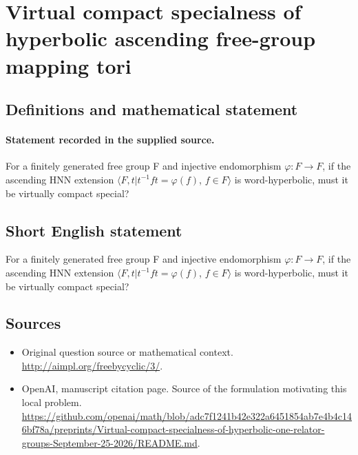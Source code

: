 \documentclass[11pt]{article}
\begin{document}
\section*{Virtual compact specialness of hyperbolic ascending free-group mapping tori}\label{statement}
\subsection{Definitions and mathematical statement}
\paragraph{Statement recorded in the supplied source.}
For a finitely generated free group F and injective endomorphism $\varphi :F\to F$, if the ascending HNN extension $\langle F,t|t^{-1}ft=\varphi (f)$, $f\in F\rangle $ is word-hyperbolic, must it be virtually compact special?
\subsection{Short English statement}
For a finitely generated free group F and injective endomorphism $\varphi :F\to F$, if the ascending HNN extension $\langle F,t|t^{-1}ft=\varphi (f)$, $f\in F\rangle $ is word-hyperbolic, must it be virtually compact special?
\subsection{Sources}
\begin{itemize}
\item[S1] Original question source or mathematical context.
\url{http://aimpl.org/freebycyclic/3/}.
\item[S2] OpenAI, manuscript citation page. Source of the formulation motivating this local problem.
\url{https://github.com/openai/math/blob/adc7f1241b42e322a6451854ab7e4b4c146bf78a/preprints/Virtual-compact-specialness-of-hyperbolic-one-relator-groups-September-25-2026/README.md}.
\end{itemize}
\end{document}
